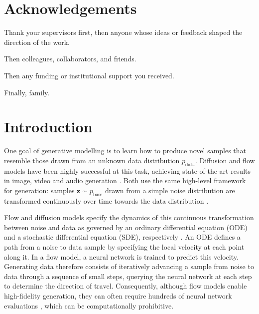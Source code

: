 \documentclass[12pt,a4paper]{report}
\begin{document}
\clearpage


\chapter*{Acknowledgements}
\thispagestyle{empty}

Thank your supervisors first, then anyone whose ideas or feedback shaped
the direction of the work.

Then colleagues, collaborators, and friends.

Then any funding or institutional support you received.

Finally, family.

\clearpage


\tableofcontents
\clearpage

\listoffigures
\clearpage



\clearpage
{}
\setcounter{page}{1}


\chapter{Introduction}
\label{chap:introduction}
One goal of generative modelling is to learn how to produce novel samples that resemble those drawn from an unknown data distribution $p_{\mathrm{data}}$. Diffusion and flow models \parencite{DDPM,Song_diffusion,diffusion_design,lipman_FM,rectified_flow} have been highly successful at this task, achieving state-of-the-art results in image, video and audio generation \parencite{rombach2022highresolutionimagesynthesislatent,ho2022videodiffusionmodels,liu2023audioldmtexttoaudiogenerationlatent}. Both use the same high-level framework for generation: samples $\mathbf{z}\sim p_{\mathrm{base}}$ drawn from a simple noise distribution are transformed continuously over time towards the data distribution \parencite{albergo2025stochasticinterpolantsunifyingframework}.

Flow and diffusion models specify the dynamics of this continuous transformation between noise and data as governed by an ordinary differential equation (ODE) and a stochastic differential equation (SDE), respectively \parencite{lipman_FM,mit_FM}. 
An ODE defines a path from a noise to data sample by specifying the local velocity at each point along it. 
In a flow model, a neural network is trained to predict this velocity. 
Generating data therefore consists of iteratively advancing a sample from noise to data through a sequence of small steps, querying the neural network at each step to determine the direction of travel.
Consequently, although flow models enable high-fidelity generation, they can often require hundreds of neural network evaluations \parencite{diffusion_design}, which can be computationally prohibitive. 
\end{document}
